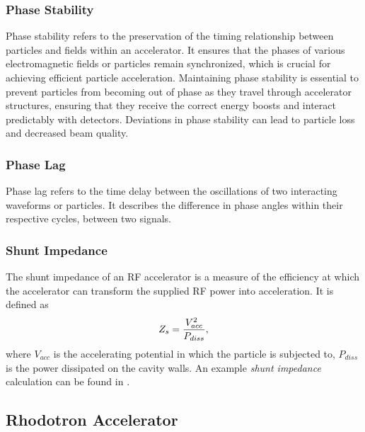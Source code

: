 \documentclass[a4paper,oneside,12pt]{report}
\numberwithin{equation}{chapter}
\begin{document}
\subsubsection{\hspace{4pt}Phase Stability}\hspace{4pt}
Phase stability refers to the preservation of the timing relationship between particles and fields within an accelerator. 
It ensures that the phases of various electromagnetic fields or particles remain synchronized, 
which is crucial for achieving efficient particle acceleration. 
Maintaining phase stability is essential to prevent particles from becoming out of phase as they travel through accelerator structures, 
ensuring that they receive the correct energy boosts and interact predictably with detectors. 
Deviations in phase stability can lead to particle loss and decreased beam quality.

\subsubsection{\hspace{4pt}Phase Lag}\hspace{4pt}
Phase lag refers to the time delay between the oscillations of two interacting waveforms or particles. 
It describes the difference in phase angles within their respective cycles, between two signals. 

\subsubsection{\hspace{4pt}Shunt Impedance}\hspace{4pt}
The shunt impedance of an RF accelerator is a measure of the efficiency 
at which the accelerator can transform the supplied RF power into acceleration.
It is defined as
\vspace{-10pt}\begin{equation} \label{eq:shunt}
    Z_s = \frac{V_{acc}^2}{P_{diss}}  ,
\vspace{-10pt}\end{equation}
where $V_{acc}$ is the accelerating potential in which the particle is subjected to, 
$P_{diss}$ is the power dissipated on the cavity walls. 
An example \textit{shunt impedance} calculation can be found in .


\subsection{Rhodotron Accelerator} \label{sec:theory_rhodo}
\end{document}
